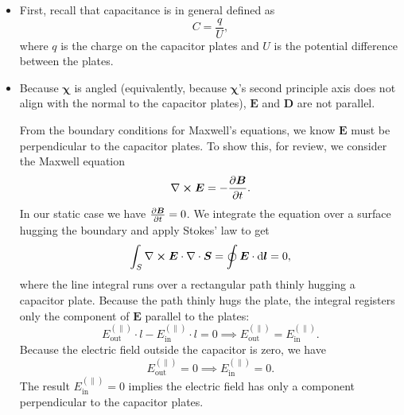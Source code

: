 \documentclass[11pt, a4paper]{article}
\newcommand{\diff}{\mathop{}\!\mathrm{d}} %
\renewcommand{\vec}[1]{\bm{#1}} %
\newcommand{\E}{\vec{E}}  %
\newcommand{\D}{\vec{D}}  %
\newcommand{\B}{\vec{B}}  %
\newcommand{\eee}{\bm{\chi}}  %
\renewcommand{\div}{\nabla \cdot}
\renewcommand{\curl}{\nabla \cross}
\begin{document}

\begin{itemize}
	\item First, recall that capacitance is in general defined as
	\begin{equation*}
		C = \frac{q}{U},
	\end{equation*}
	where $ q $ is the charge on the capacitor plates and $ U $ is the potential difference between the plates.
	
	\item Because $ \eee $ is angled (equivalently, because $ \eee $'s second principle axis does not align with the normal to the capacitor plates), $ \E $ and $ \D $ are not parallel. 
	
	From the boundary conditions for Maxwell's equations, we know $ \E $ must be perpendicular to the capacitor plates. To show this, for review, we consider the Maxwell equation
	\begin{equation*}
		\curl \E = - \pdv{\B}{t}.
	\end{equation*}
	In our static case we have $ \pdv{\B}{t} = 0 $. We integrate the equation over a surface hugging the boundary and apply Stokes' law to get 
	\begin{equation*}
		\int_{S}\curl \E \cdot \div \vec{S} = \oint \E \cdot \diff \vec{l} = 0,
	\end{equation*}
	where the line integral runs over a rectangular path thinly hugging a capacitor plate. Because the path thinly hugs the plate, the integral registers only the component of $ \E $ parallel to the plates:
	\begin{equation*}
		E_{\text{out}}^{(\parallel)}\cdot l - E_{\text{in}}^{(\parallel)} \cdot l = 0 \implies E_{\text{out}}^{(\parallel)} = E_{\text{in}}^{(\parallel)}.
	\end{equation*}
	Because the electric field outside the capacitor is zero, we have
	\begin{equation*}
		E_{\text{out}}^{(\parallel)} = 0 \implies E_{\text{in}}^{(\parallel)} = 0.
	\end{equation*}
	The result $ E_{\text{in}}^{(\parallel)} = 0 $ implies the electric field has only a component perpendicular to the capacitor plates. 
	

\end{itemize}
\end{document}
